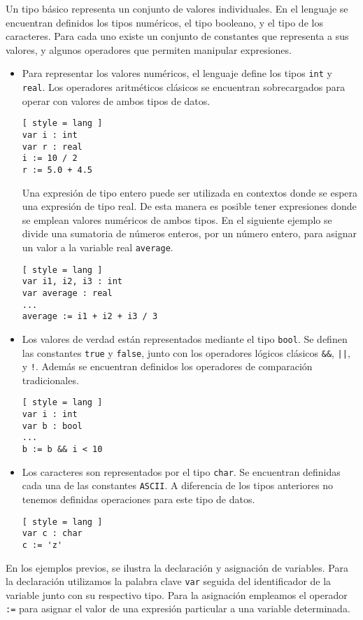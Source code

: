 Un tipo básico representa un conjunto de valores individuales.
En el lenguaje se encuentran definidos los tipos numéricos, el tipo booleano, y el tipo de los caracteres.
Para cada uno existe un conjunto de constantes que representa a sus valores, y algunos operadores que permiten manipular expresiones.
\begin{itemize}
\item
Para representar los valores numéricos, el lenguaje define los tipos \lstinline[style = lang]{int} y \lstinline[style = lang]{real}. 
Los operadores aritméticos clásicos se encuentran sobrecargados para operar con valores de ambos tipos de datos.
\begin{lstlisting}[ style = lang ]
var i : int
var r : real
i := 10 / 2
r := 5.0 + 4.5
\end{lstlisting}
Una expresión de tipo entero puede ser utilizada en contextos donde se espera una expresión de tipo real.
De esta manera es posible tener expresiones donde se emplean valores numéricos de ambos tipos.
En el siguiente ejemplo se divide una sumatoria de números enteros, por un número entero, para asignar un valor a la variable real \lstinline[style = lang]{average}.
\begin{lstlisting}[ style = lang ]
var i1, i2, i3 : int
var average : real
...
average := i1 + i2 + i3 / 3
\end{lstlisting}
\item
Los valores de verdad están representados mediante el tipo \lstinline[style = lang]{bool}.
Se definen las constantes \lstinline[style = lang]{true} y \lstinline[style = lang]{false}, junto con los operadores lógicos clásicos \lstinline[style = lang]{&&}, \lstinline[style = lang]{||}, y \lstinline[style = lang]{!}.
Además se encuentran definidos los operadores de comparación tradicionales.
\begin{lstlisting}[ style = lang ]
var i : int
var b : bool
...
b := b && i < 10
\end{lstlisting}
\item
Los caracteres son representados por el tipo \lstinline[style = lang]{char}.
Se encuentran definidas cada una de las constantes \texttt{ASCII}.
A diferencia de los tipos anteriores no tenemos definidas operaciones para este tipo de datos.
\begin{lstlisting}[ style = lang ]
var c : char
c := 'z'
\end{lstlisting}
\end{itemize}

En los ejemplos previos, se ilustra la declaración y asignación de variables.
Para la declaración utilizamos la palabra clave \lstinline[style = lang]{var} seguida del identificador de la variable junto con su respectivo tipo.
Para la asignación empleamos el operador \lstinline[style = lang]{:=} para asignar el valor de una expresión particular a una variable determinada.

